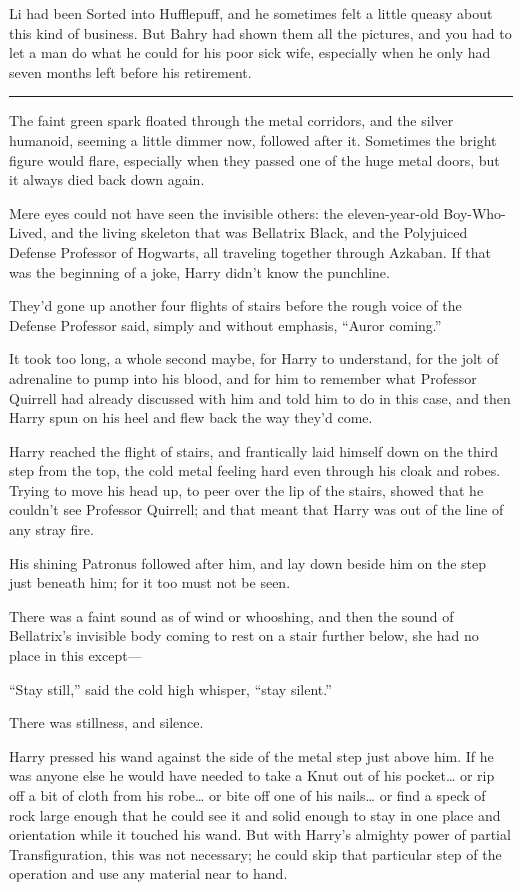 Li had been Sorted into Hufflepuff, and he sometimes felt a little
queasy about this kind of business. But Bahry had shown them all the
pictures, and you had to let a man do what he could for his poor sick
wife, especially when he only had seven months left before his
retirement.

\begin{center}\rule{3in}{0.4pt}\end{center}

The faint green spark floated through the metal corridors, and the
silver humanoid, seeming a little dimmer now, followed after it.
Sometimes the bright figure would flare, especially when they passed one
of the huge metal doors, but it always died back down again.

Mere eyes could not have seen the invisible others: the eleven-year-old
Boy-Who-Lived, and the living skeleton that was Bellatrix Black, and the
Polyjuiced Defense Professor of Hogwarts, all traveling together through
Azkaban. If that was the beginning of a joke, Harry didn't know the
punchline.

They'd gone up another four flights of stairs before the rough voice of
the Defense Professor said, simply and without emphasis, ``Auror
coming.''

It took too long, a whole second maybe, for Harry to understand, for the
jolt of adrenaline to pump into his blood, and for him to remember what
Professor Quirrell had already discussed with him and told him to do in
this case, and then Harry spun on his heel and flew back the way they'd
come.

Harry reached the flight of stairs, and frantically laid himself down on
the third step from the top, the cold metal feeling hard even through
his cloak and robes. Trying to move his head up, to peer over the lip of
the stairs, showed that he couldn't see Professor Quirrell; and that
meant that Harry was out of the line of any stray fire.

His shining Patronus followed after him, and lay down beside him on the
step just beneath him; for it too must not be seen.

There was a faint sound as of wind or whooshing, and then the sound of
Bellatrix's invisible body coming to rest on a stair further below, she
had no place in this except---

``Stay still,'' said the cold high whisper, ``stay silent.''

There was stillness, and silence.

Harry pressed his wand against the side of the metal step just above
him. If he was anyone else he would have needed to take a Knut out of
his pocket\ldots{} or rip off a bit of cloth from his robe\ldots{} or
bite off one of his nails\ldots{} or find a speck of rock large enough
that he could see it and solid enough to stay in one place and
orientation while it touched his wand. But with Harry's almighty power
of partial Transfiguration, this was not necessary; he could skip that
particular step of the operation and use any material near to hand.

